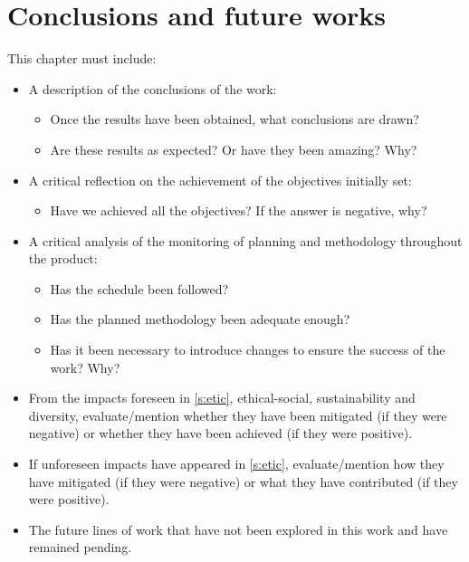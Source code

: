 \documentclass[ENG]{TFUOC}%
\begin{document}
\chapter{Conclusions and future works}

This chapter must include:
\begin{itemize}
\item A description of the conclusions of the work:
\begin{itemize}
    \item Once the results have been obtained, what conclusions are drawn?
    \item Are these results as expected? Or have they been amazing? Why?
\end{itemize}
\item A critical reflection on the achievement of the objectives initially set:
\begin{itemize}
    \item Have we achieved all the objectives? If the answer is negative, why?
\end{itemize}
\item A critical analysis of the monitoring of planning and methodology throughout the product:
\begin{itemize}
    \item Has the schedule been followed?
    \item Has the planned methodology been adequate enough?
    \item Has it been necessary to introduce changes to ensure the success of the work? Why?
\end{itemize}
\item From the impacts foreseen in \ref{s:etic}, ethical-social, sustainability and diversity, evaluate/mention whether they have been mitigated (if they were negative) or whether they have been achieved (if they were positive). 
\item If unforeseen impacts have appeared in \ref{s:etic}, evaluate/mention how they have mitigated (if they were negative) or what they have contributed (if they were positive).
\item The future lines of work that have not been explored in this work and have remained pending.


\end{itemize}
\end{document}
